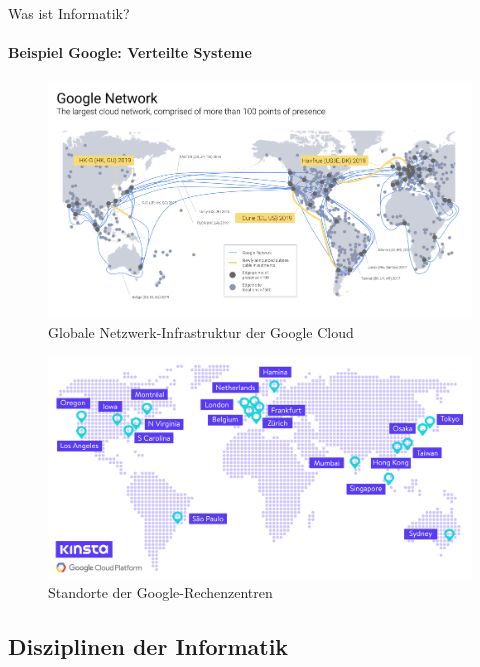     
    \begin{frame}{Was ist Informatik?}
        \framesubtitle{Beispiel Google: Verteilte Systeme}
        \begin{figure}
            \centering
            \includegraphics[width=\linewidth,height=0.3\textheight,keepaspectratio]{chapters/02_computer_science/figures/google/distributed/infrastructure.png}
            \caption{Globale Netzwerk-Infrastruktur der Google Cloud \cite{google:dist:infra}}
            \label{fig:my_label}
        \end{figure}
        
        \begin{figure}
            \centering
            \includegraphics[width=\linewidth,height=0.3\textheight,keepaspectratio]{chapters/02_computer_science/figures/google/distributed/datacenter.png}
            \caption{Standorte der Google-Rechenzentren \cite{google:dist:datacenter}}
            \label{fig:my_label}
        \end{figure}
        
        
    \end{frame}

    \subsection{Disziplinen der Informatik} 
    
